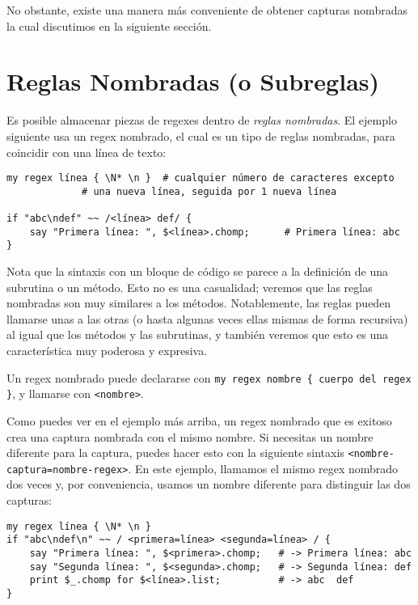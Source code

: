 No obstante, existe una manera más conveniente de obtener
capturas nombradas la cual discutimos en la siguiente sección.

\section{Reglas Nombradas (o Subreglas)}
\label{subrules}

Es posible almacenar piezas de regexes dentro 
de \emph{reglas nombradas}. El ejemplo siguiente usa un
regex nombrado, el cual es un tipo de reglas nombradas, 
para coincidir con una línea de texto:

\begin{verbatim}
my regex línea { \N* \n }  # cualquier número de caracteres excepto
			 # una nueva línea, seguida por 1 nueva línea 

if "abc\ndef" ~~ /<línea> def/ {
    say "Primera línea: ", $<línea>.chomp;      # Primera línea: abc
}
\end{verbatim} 

Nota que la sintaxis con un bloque de código se parece
a la definición de una subrutina o un método. Esto no es una
casualidad; veremos que las reglas nombradas son muy similares
a los métodos. Notablemente, las reglas pueden llamarse unas
a las otras (o hasta algunas veces ellas mismas de forma
recursiva) al igual que los métodos y las subrutinas,
y también veremos que esto es una característica muy poderosa
y expresiva.

Un regex nombrado puede declararse con 
\verb|my regex nombre { cuerpo del regex }|, y 
llamarse con {\tt <nombre>}.

Como puedes ver en el ejemplo más arriba, un regex
nombrado que es exitoso crea una captura nombrada 
con el mismo nombre. Si necesitas un nombre diferente
para la captura, puedes hacer esto con la siguiente
sintaxis {\tt <nombre-captura=nombre-regex>}. En este
ejemplo, llamamos el mismo regex nombrado dos veces y,
por conveniencia, usamos un nombre diferente para distinguir
las dos capturas:

\begin{verbatim}
my regex línea { \N* \n }
if "abc\ndef\n" ~~ / <primera=línea> <segunda=línea> / {
    say "Primera línea: ", $<primera>.chomp;   # -> Primera línea: abc
    say "Segunda línea: ", $<segunda>.chomp;   # -> Segunda línea: def
    print $_.chomp for $<línea>.list;          # -> abc  def
}
\end{verbatim}


